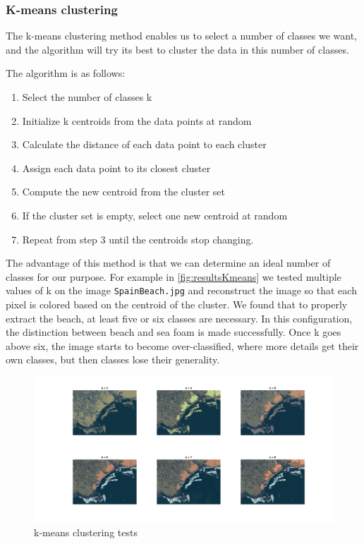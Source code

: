 \subsubsection{K-means clustering}

The k-means clustering method enables us to select a number of classes we want, and the algorithm will try its best to cluster the data in this number of classes.

The algorithm is as follows:
\begin{enumerate}
    \item Select the number of classes k
    \item Initialize k centroids from the data points at random
    \item Calculate the distance of each data point to each cluster
    \item Assign each data point to its closest cluster
    \item Compute the new centroid from the cluster set
    \item If the cluster set is empty, select one new centroid at random
    \item Repeat from step 3 until the centroids stop changing.
\end{enumerate}

The advantage of this method is that we can determine an ideal number of classes for our purpose. For example in \autoref{fig:resultsKmeans} we tested multiple values of k on the image \texttt{SpainBeach.jpg} and reconstruct the image so that each pixel is colored based on the centroid of the cluster. We found that to properly extract the beach, at least five or six classes are necessary. In this configuration, the distinction between beach and sea foam is made successfully. Once k goes above six, the image starts to become over-classified, where more details get their own classes, but then classes lose their generality.
\begin{figure}[!ht]
    \centering
    \includegraphics[width=\linewidth]{Doc/Graphics/Part4/kMeans_comparison.png}
    \caption{k-means clustering tests}
    \label{fig:resultsKmeans}
\end{figure}